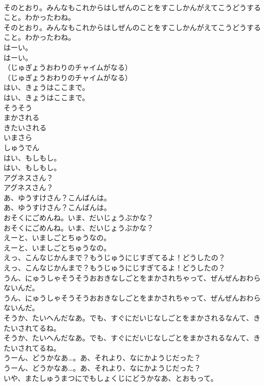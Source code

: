 \documentclass[8pt]{extreport}
\begin{document}
\begin{CJK}{UTF8}{min}
\\	そのとおり。みんなもこれからはしぜんのことをすこしかんがえてこうどうすること。わかったわね。
\\	そのとおり。みんなもこれからはしぜんのことをすこしかんがえてこうどうすること。わかったわね。
\\	はーい。
\\	はーい。
\\	（じゅぎょうおわりのチャイムがなる）
\\	（じゅぎょうおわりのチャイムがなる）
\\	はい、きょうはここまで。
\\	はい、きょうはここまで。
\\	そうそう
\\	まかされる
\\	きたいされる
\\	いまさら
\\	しゅうでん
\\	はい、もしもし。
\\	はい、もしもし。
\\	アグネスさん？
\\	アグネスさん？
\\	あ、ゆうすけさん？こんばんは。
\\	あ、ゆうすけさん？こんばんは。
\\	おそくにごめんね。いま、だいじょうぶかな？
\\	おそくにごめんね。いま、だいじょうぶかな？
\\	えーと、いましごとちゅうなの。
\\	えーと、いましごとちゅうなの。
\\	えっ、こんなじかんまで？もうじゅうにじすぎてるよ！どうしたの？
\\	えっ、こんなじかんまで？もうじゅうにじすぎてるよ！どうしたの？
\\	うん、にゅうしゃそうそうおおきなしごとをまかされちゃって、ぜんぜんおわらないんだ。
\\	うん、にゅうしゃそうそうおおきなしごとをまかされちゃって、ぜんぜんおわらないんだ。
\\	そうか、たいへんだなあ。でも、すぐにだいじなしごとをまかされるなんて、きたいされてるね。
\\	そうか、たいへんだなあ。でも、すぐにだいじなしごとをまかされるなんて、きたいされてるね。
\\	うーん、どうかなあ…。あ、それより、なにかようじだった？
\\	うーん、どうかなあ…。あ、それより、なにかようじだった？
\\	いや、またしゅうまつにでもしょくじにどうかなあ、とおもって。

\end{CJK}
\end{document}
